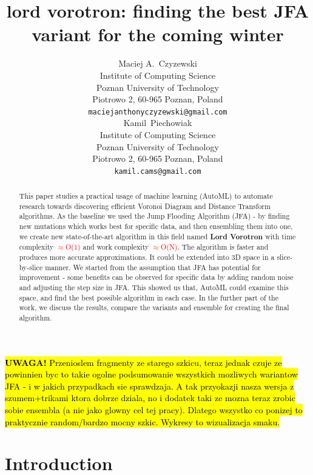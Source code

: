 \documentclass{article}
\title{lord vorotron: finding the best JFA variant for the coming winter} %
\author{
  Maciej A.~Czyzewski\\
  Institute of Computing Science\\
  Poznan University of Technology\\
  Piotrowo 2, 60-965 Poznan, Poland\\
  \texttt{maciejanthonyczyzewski@gmail.com} \\
  \And
  Kamil~Piechowiak\\
  Institute of Computing Science\\
  Poznan University of Technology\\
  Piotrowo 2, 60-965 Poznan, Poland\\
  \texttt{kamil.cams@gmail.com} \\
}
\newcommand{\ourjfa}{Lord Vorotron} %
\begin{document}

\maketitle

\hl{\textbf{UWAGA!} Przenioslem fragmenty ze starego szkicu, teraz jednak czuje ze
powinnien byc to takie ogolne podsumowanie wszystkich mozliwych wariantow JFA - i
w jakich przypadkach sie sprawdzaja. A tak przyokazji nasza wersja z szumem+trikami
ktora dobrze dziala, no i dodatek taki ze mozna teraz zrobic sobie ensembla (a
nie jako glowny cel tej pracy). Dlatego wszystko co ponizej to praktycznie
random/bardzo mocny szkic. Wykresy to wizualizacja smaku.}
\newline

\begin{abstract}
This paper studies a practical usage of machine learning (AutoML) to automate
research towards discovering efficient Voronoi Diagram and Distance Transform
algorithms.  As the baseline we used the Jump Flooding Algorithm (JFA) - by
finding new mutations which works best for specific data, and then ensembling
them into one, we create new state-of-the-art algorithm in this field named
\textbf{\ourjfa} \hspace{0.01cm} with time complexity \textcolor{red}{$\approx$O(1)} and
work complexity \textcolor{red}{$\approx$O(N)}.
The algorithm is faster and produces more accurate approximations. It could be
extended into 3D space in a slice-by-slice manner.  We started from the
assumption that JFA has potential for improvement - some benefits can be
observed for specific data by adding random noise and adjusting the step size in
JFA.  This showed us that, AutoML could examine this space, and find the best
possible algorithm in each case.  In the further part of the work, we discuss
the results, compare the variants and ensemble for creating the final algorithm.
\end{abstract}


\section{Introduction} %
\end{document}
